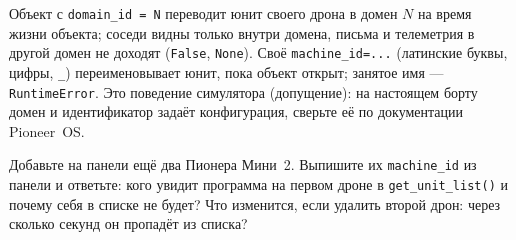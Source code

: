\begin{infobox}
Объект с \verb|domain_id = N| переводит юнит своего дрона в домен $N$ на время жизни объекта; соседи видны только внутри домена, письма и телеметрия в другой домен не доходят (\verb|False|, \verb|None|). Своё \verb|machine_id=...| (латинские буквы, цифры, \verb|_|) переименовывает юнит, пока объект открыт; занятое имя --- \verb|RuntimeError|. Это поведение симулятора (допущение): на настоящем борту домен и идентификатор задаёт конфигурация, сверьте её по документации Pioneer~OS.
\end{infobox}

\begin{taskbox}
Добавьте на панели  ещё два Пионера Мини~2. Выпишите их \texttt{machine\_id} из панели и ответьте: кого увидит программа на первом дроне в \verb|get_unit_list()| и почему себя в списке не будет? Что изменится, если удалить второй дрон: через сколько секунд он пропадёт из списка?
\end{taskbox}

